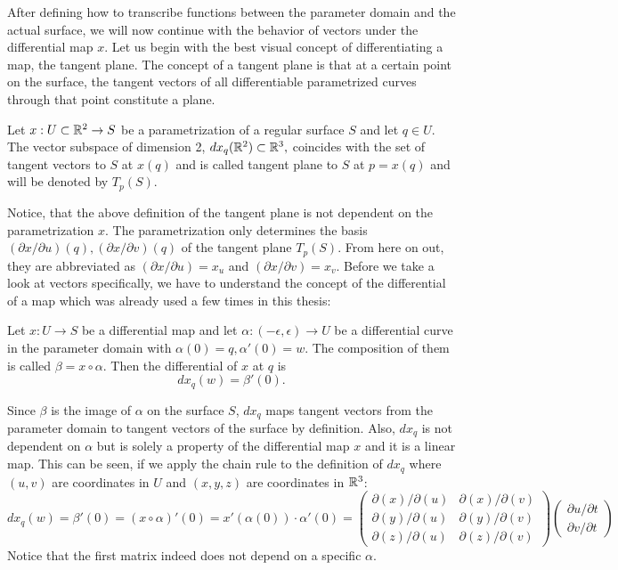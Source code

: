 After defining how to transcribe functions between the parameter domain and the actual surface, we will now continue with the behavior of vectors under the differential map $x$.
Let us begin with the best visual concept of differentiating a map, the tangent plane.
The concept of a tangent plane is that at a certain point on the surface, the tangent vectors of all differentiable parametrized curves through that point constitute a plane.
\begin{mydef}
	Let $x: U  \subset \mathbb{R}^2 \rightarrow S$ be a parametrization of a regular surface $S$ and let $q \in U$.
	The vector subspace of dimension 2, $dx_q(\mathbb{R}^2) \subset \mathbb{R}^3,$ coincides with the set of tangent vectors to $S$ at $x(q)$ and is called tangent plane to $S$ at $p = x(q)$ and will be denoted by $T_p(S)$.
\end{mydef}
Notice, that the above definition of the tangent plane is not dependent on the parametrization $x$.
The parametrization only determines the basis ${(\partial x/\partial u)(q), (\partial x/\partial v)(q)}$ of the tangent plane $T_p(S)$.
From here on out, they are abbreviated as $(\partial x/\partial u) = x_u$ and $(\partial x/\partial v) = x_v$.
Before we take a look at vectors specifically, we have to understand the concept of the differential of a map which was already used a few times in this thesis:
\begin{mydef}
	Let $x: U \rightarrow S$ be a differential map and let $\alpha: (-\epsilon, \epsilon) \rightarrow U$ be a differential curve in the parameter domain with $\alpha(0) = q, \alpha'(0) = w$.
	The composition of them is called $\beta = x \circ \alpha$.
	Then the differential of $x$ at $q$ is
	$$dx_q(w) = \beta'(0).$$
\end{mydef}
Since $\beta$ is the image of $\alpha$ on the surface $S$, $dx_q$ maps tangent vectors from the parameter domain to tangent vectors of the surface by definition.
Also, $dx_q$ is not dependent on $\alpha$ but is solely a property of the differential map $x$ and it is a linear map.
This can be seen, if we apply the chain rule to the definition of $dx_q$ where $(u,v)$ are coordinates in $U$ and $(x,y,z)$ are coordinates in $\mathbb{R}^3$:
$$dx_q(w) = \beta'(0) = (x \circ \alpha)'(0) = x'(\alpha(0)) \cdot \alpha'(0) = \begin{pmatrix} \partial(x)/\partial(u) & \partial(x)/\partial(v) \\
																								\partial(y)/\partial(u) & \partial(y)/\partial(v) \\
																								\partial(z)/\partial(u) & \partial(z)/\partial(v)
																				\end{pmatrix}
	\begin{pmatrix} \partial u/\partial t \\ \partial v /\partial t \end{pmatrix} $$
Notice that the first matrix indeed does not depend on a specific $\alpha$.

